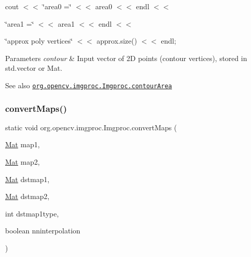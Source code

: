 {\ttfamily cout $<$$<$ \char`\"{}area0 =\char`\"{} $<$$<$ area0 $<$$<$ endl $<$$<$}

{\ttfamily }

{\ttfamily }

{\ttfamily \char`\"{}area1 =\char`\"{} $<$$<$ area1 $<$$<$ endl $<$$<$}

{\ttfamily }

{\ttfamily }

{\ttfamily \char`\"{}approx poly vertices\char`\"{} $<$$<$ approx.\+size() $<$$<$ endl;}

{\ttfamily }

{\ttfamily 
\begin{DoxyParams}{Parameters}
{\em contour} & Input vector of 2D points (contour vertices), stored in {\ttfamily std.\+vector} or {\ttfamily Mat}.\\
\hline
\end{DoxyParams}
\begin{DoxySeeAlso}{See also}
\href{http://docs.opencv.org/modules/imgproc/doc/structural_analysis_and_shape_descriptors.html#contourarea}{\tt org.\+opencv.\+imgproc.\+Imgproc.\+contour\+Area} 
\end{DoxySeeAlso}
}\mbox{\label{classorg_1_1opencv_1_1imgproc_1_1_imgproc_a03418d25b2a22395f42e32d869937f95}} 
\subsubsection{\texorpdfstring{convert\+Maps()}{convertMaps()}\hspace{0.1cm}{\footnotesize\ttfamily [1/2]}}
{\footnotesize\ttfamily static void org.\+opencv.\+imgproc.\+Imgproc.\+convert\+Maps (\begin{DoxyParamCaption}\item[{\mbox{\hyperlink{classorg_1_1opencv_1_1core_1_1_mat}{Mat}}}]{map1,  }\item[{\mbox{\hyperlink{classorg_1_1opencv_1_1core_1_1_mat}{Mat}}}]{map2,  }\item[{\mbox{\hyperlink{classorg_1_1opencv_1_1core_1_1_mat}{Mat}}}]{dstmap1,  }\item[{\mbox{\hyperlink{classorg_1_1opencv_1_1core_1_1_mat}{Mat}}}]{dstmap2,  }\item[{int}]{dstmap1type,  }\item[{boolean}]{nninterpolation }\end{DoxyParamCaption})\hspace{0.3cm}{\ttfamily [static]}}

